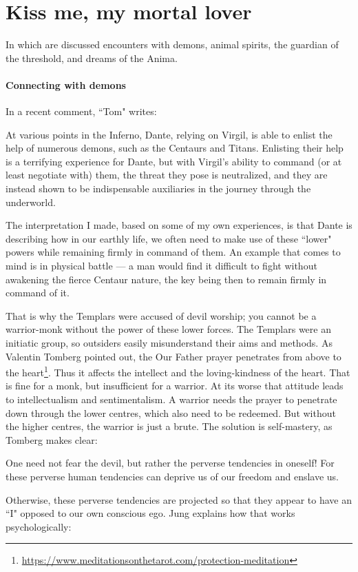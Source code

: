 \section{Kiss me, my mortal lover}

In which are discussed encounters with demons, animal spirits, the guardian of the threshold, and dreams of the Anima.

\paragraph{Connecting with demons}

In a recent comment, ``Tom" writes:

\begin{quotex}
At various points in the Inferno, Dante, relying on Virgil, is able to enlist the help of numerous demons, such as the
Centaurs and Titans. Enlisting their help is a terrifying experience for Dante, but with Virgil's
ability to command (or at least negotiate with) them, the threat they pose is neutralized, and they are instead shown
to be indispensable auxiliaries in the journey through the underworld.

The interpretation I made, based on some of my own experiences, is that Dante is describing how in our earthly life, we
often need to make use of these ``lower" powers while remaining firmly in command of them. An example that comes to mind
is in physical battle — a man would find it difficult to fight without awakening the fierce
Centaur nature, the key being then to remain firmly in command of it. 

\end{quotex}
That is why the Templars were accused of devil worship; you cannot be a warrior-monk without the power of these lower
forces. The Templars were an initiatic group, so outsiders easily misunderstand their aims and methods. As Valentin
Tomberg pointed out, the Our Father prayer penetrates from above to the heart\footnote{\url{https://www.meditationsonthetarot.com/protection-meditation}}. Thus it affects the intellect and the
loving-kindness of the heart. That is fine for a monk, but insufficient for a warrior. At its worse that attitude leads
to intellectualism and sentimentalism. A warrior needs the prayer to penetrate down through the lower centres, which
also need to be redeemed. But without the higher centres, the warrior is just a brute. The solution is self-mastery, as
Tomberg makes clear:

\begin{quotex}
One need not fear the devil, but rather the perverse tendencies in oneself! For these perverse human tendencies can
deprive us of our freedom and enslave us. 

\end{quotex}
Otherwise, these perverse tendencies are projected so that they appear to have an ``I" opposed to our own conscious ego.
Jung explains how that works psychologically:

